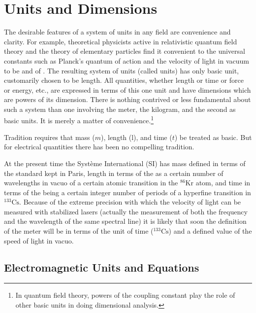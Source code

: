 \chapter{Units and Dimensions}\label{ch:1}

The desirable features of a system of units in any field are convenience and clarity. For example, theoretical physicists active in relativistic quantum field theory and the theory of elementary particles find it convenient to 
the universal constants such as Planck's quantum of action and the velocity of light in vacuum to be 
and of . The resulting system of units (called  units) has only  basic unit, customarily chosen to be length. All quantities, whether length or time or force or energy, etc., are expressed in terms of this one unit and have dimensions which are powers of its dimension. There is nothing contrived or less fundamental about such a system than one involving the meter, the kilogram, and the second as basic units. It is merely a matter of convenience.\footnote[1]{In quantum field theory, powers of the coupling constant play the role of other basic units in doing dimensional analysis.} 

Tradition requires that mass ($m$), length (l), and time ($t$) be treated as basic. But for electrical quantities there has been no compelling tradition. 

At the present time the Système International (SI) has mass defined in terms of the standard  kept in Paris, length in terms of the  as a certain number of wavelengths in vacuo of a certain atomic transition in the $^{86}\text{Kr}$ atom, and time in terms of the  being a certain integer number of periods of a hyperfine transition in $^{133}\text{Cs}$. Because of the extreme precision with which the velocity of light can be measured with stabilized lasers (actually the measurement of both the frequency and the wavelength of the same spectral line) it is likely that soon the definition of the meter will be in terms of the unit of time ($^{133}\text{Cs}$) and a defined value of the speed of light in vacuo.


\section{Electromagnetic Units and Equations}\label{sec:1.1}

